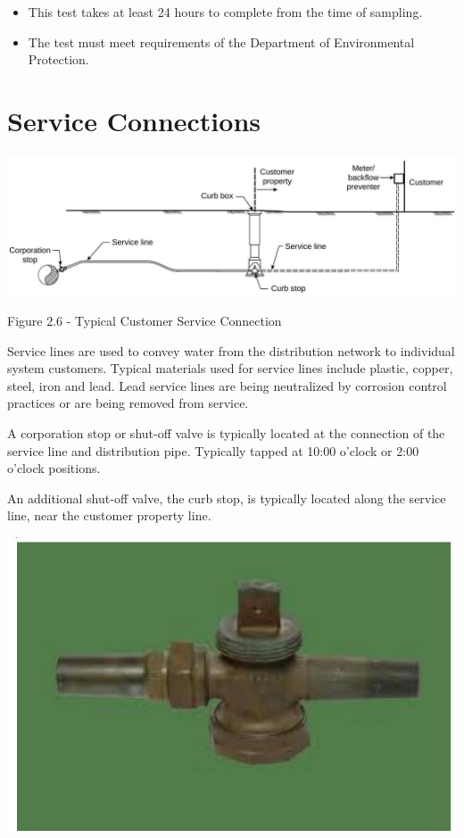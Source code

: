 \documentclass[10pt]{article}
\begin{document}
\begin{itemize}
  \item This test takes at least 24 hours to complete from the time of sampling.

  \item The test must meet requirements of the Department of Environmental Protection.

\end{itemize}
\section{Service Connections}
\includegraphics[max width=\textwidth]{TypicalCustomerServiceConnection}

Figure $2.6$ - Typical Customer Service Connection

Service lines are used to convey water from the distribution network to individual system customers. Typical materials used for service lines include plastic, copper, steel, iron and lead. Lead service lines are being neutralized by corrosion control practices or are being removed from service.

A corporation stop or shut-off valve is typically located at the connection of the service line and distribution pipe. Typically tapped at 10:00 o'clock or 2:00 o'clock positions.

An additional shut-off valve, the curb stop, is typically located along the service line, near the customer property line.

\includegraphics[max width=\textwidth]{TypicalCurbStop}
\end{document}
